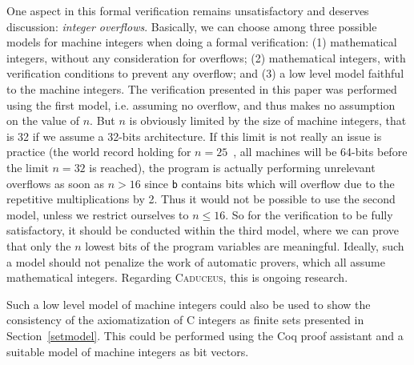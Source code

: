 \documentclass[a4paper]{llncs}
\newcommand{\caduceus}{\textsc{Caduceus}}
\begin{document}
One aspect in this formal verification
remains unsatisfactory and deserves discussion: \emph{integer
  overflows}. Basically, we can 
choose among three possible models for machine integers when doing a
formal verification: (1) mathematical integers, without any
consideration for overflows; (2) mathematical integers, with
verification conditions to prevent any overflow; and (3) a low level
model faithful to the machine integers. The verification presented in
this paper was performed using the first model, i.e. assuming no
overflow, and thus makes no assumption on the value of $n$. But 
$n$ is obviously limited by the size of machine integers, that is 32 if we
assume a 32-bits architecture. If this limit is not really an issue is
practice (the world record holding for $n=25$~\cite{nqueensrecord},
all machines will be 64-bits before the limit $n=32$ is reached), 
the program is actually performing unrelevant overflows as soon as
$n>16$ since \texttt{b} contains bits which will overflow
due to the repetitive multiplications by 2. Thus it would not be
possible to use the second model, unless we restrict ourselves to
$n\le 16$. So for the verification to be fully satisfactory, it should
be conducted within the third model, where we can prove that only the
$n$ lowest bits of the program variables are meaningful. Ideally, such a model
should not penalize the work of automatic provers, which all assume
mathematical integers. Regarding \caduceus, this is ongoing research.

Such a low level model of machine integers could also be used to
show the consistency of the axiomatization of C integers as finite
sets presented in Section~\ref{setmodel}.
This could be performed using the Coq proof assistant and a suitable
model of machine integers as bit vectors.


\nocite{*}



\appendix
\end{document}
